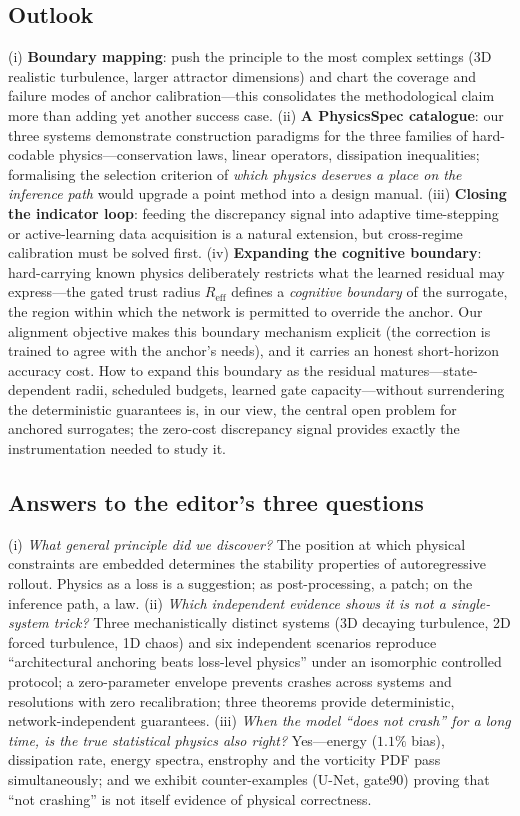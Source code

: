 \documentclass[11pt,a4paper]{article}
\begin{document}
\subsection{Outlook}

(i) \textbf{Boundary mapping}: push the principle to the most complex settings (3D realistic turbulence, larger attractor dimensions) and chart the coverage and failure modes of anchor calibration---this consolidates the methodological claim more than adding yet another success case. (ii) \textbf{A PhysicsSpec catalogue}: our three systems demonstrate construction paradigms for the three families of hard-codable physics---conservation laws, linear operators, dissipation inequalities; formalising the selection criterion of \emph{which physics deserves a place on the inference path} would upgrade a point method into a design manual. (iii) \textbf{Closing the indicator loop}: feeding the discrepancy signal into adaptive time-stepping or active-learning data acquisition is a natural extension, but cross-regime calibration must be solved first. (iv) \textbf{Expanding the cognitive boundary}: hard-carrying known physics deliberately restricts what the learned residual may express---the gated trust radius $R_{\mathrm{eff}}$ defines a \emph{cognitive boundary} of the surrogate, the region within which the network is permitted to override the anchor. Our alignment objective makes this boundary mechanism explicit (the correction is trained to agree with the anchor's needs), and it carries an honest short-horizon accuracy cost. How to expand this boundary as the residual matures---state-dependent radii, scheduled budgets, learned gate capacity---without surrendering the deterministic guarantees is, in our view, the central open problem for anchored surrogates; the zero-cost discrepancy signal provides exactly the instrumentation needed to study it.

\subsection{Answers to the editor's three questions}

(i) \emph{What general principle did we discover?} The position at which physical constraints are embedded determines the stability properties of autoregressive rollout. Physics as a loss is a suggestion; as post-processing, a patch; on the inference path, a law. (ii) \emph{Which independent evidence shows it is not a single-system trick?} Three mechanistically distinct systems (3D decaying turbulence, 2D forced turbulence, 1D chaos) and six independent scenarios reproduce ``architectural anchoring beats loss-level physics'' under an isomorphic controlled protocol; a zero-parameter envelope prevents crashes across systems and resolutions with zero recalibration; three theorems provide deterministic, network-independent guarantees. (iii) \emph{When the model ``does not crash'' for a long time, is the true statistical physics also right?} Yes---energy ($1.1\%$ bias), dissipation rate, energy spectra, enstrophy and the vorticity PDF pass simultaneously; and we exhibit counter-examples (U-Net, gate90) proving that ``not crashing'' is not itself evidence of physical correctness.
\end{document}
